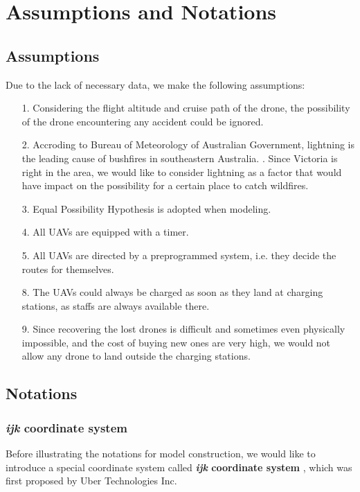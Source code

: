 \documentclass[13pt]{ctexart} %
\begin{document}
\section{Assumptions and Notations}
\vspace{-10pt}
\subsection{Assumptions}
Due to the lack of necessary data, we make the following assumptions:

\begin{itemize}[itemsep=0.3ex, leftmargin=1.2cm]
    \item[1.] Considering the flight altitude and cruise path of the drone, the possibility of the drone encountering any accident could be ignored.
    \item[2.] Accroding to Bureau of Meteorology of Australian Government, lightning is the leading cause of bushfires in southeastern Australia. \cite{au-gov-weather}. Since Victoria is right in the area, we would like to consider lightning as a factor that would have impact on the possibility for a certain place to catch wildfires.
    \item[3.] Equal Possibility Hypothesis is adopted when modeling.
    \item[4.] All UAVs are equipped with a timer.
    \item[5.] All UAVs are directed by a preprogrammed system, i.e. they decide the routes for themselves.
    \item[8.] The UAVs could always be charged as soon as they land at charging stations, as staffs are always available there.
    \item[9.]\label{ampt09} Since recovering the lost drones is difficult and sometimes even physically impossible, and the cost of buying new ones are very high, we would not allow any drone to land outside the charging stations.

\end{itemize}
\subsection{Notations}
\subsubsection{\textit{ijk} coordinate system}
Before illustrating the notations for model construction, we would like to introduce a special coordinate system called \textbf{\textit{ijk} coordinate system} \cite{uber-h3-doc}, which was first proposed by Uber Technologies Inc.
\end{document}

